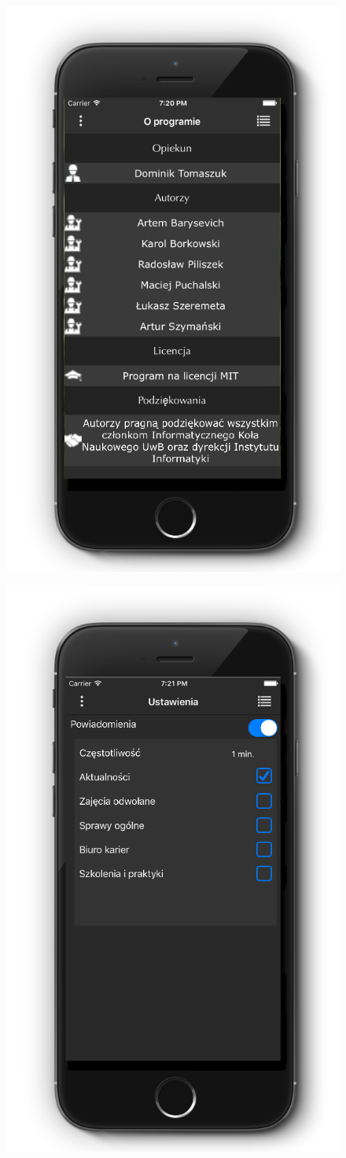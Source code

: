 \documentclass{iiuwb}
\begin{document}
\begin{figure}
\centering
\begin{minipage}{.5\textwidth}
  \centering
  \includegraphics[width=.6\linewidth]{image/OprogramieIphone.png}
  \label{fig:Oprogramie}
\end{minipage}%
\begin{minipage}{.5\textwidth}
  \centering
  \includegraphics[width=.6\linewidth]{image/UstawieniaIphone.png}
  \label{fig:Ustawienia}
\end{minipage}
\end{figure}
\end{document}
